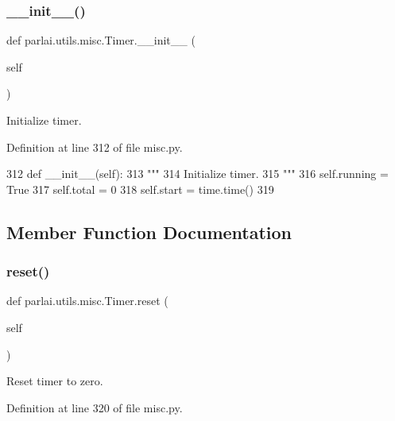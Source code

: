 \subsubsection{\texorpdfstring{\+\_\+\+\_\+init\+\_\+\+\_\+()}{\_\_init\_\_()}}
{\footnotesize\ttfamily def parlai.\+utils.\+misc.\+Timer.\+\_\+\+\_\+init\+\_\+\+\_\+ (\begin{DoxyParamCaption}\item[{}]{self }\end{DoxyParamCaption})}

\begin{DoxyVerb}Initialize timer.
\end{DoxyVerb}
 

Definition at line 312 of file misc.\+py.


\begin{DoxyCode}
312     \textcolor{keyword}{def }\_\_init\_\_(self):
313         \textcolor{stringliteral}{"""}
314 \textcolor{stringliteral}{        Initialize timer.}
315 \textcolor{stringliteral}{        """}
316         self.running = \textcolor{keyword}{True}
317         self.total = 0
318         self.start = time.time()
319 
\end{DoxyCode}


\subsection{Member Function Documentation}
\mbox{\label{classparlai_1_1utils_1_1misc_1_1Timer_a68bdf8abb3fe00edc639b21944d03371}} 
\subsubsection{\texorpdfstring{reset()}{reset()}}
{\footnotesize\ttfamily def parlai.\+utils.\+misc.\+Timer.\+reset (\begin{DoxyParamCaption}\item[{}]{self }\end{DoxyParamCaption})}

\begin{DoxyVerb}Reset timer to zero.
\end{DoxyVerb}
 

Definition at line 320 of file misc.\+py.


